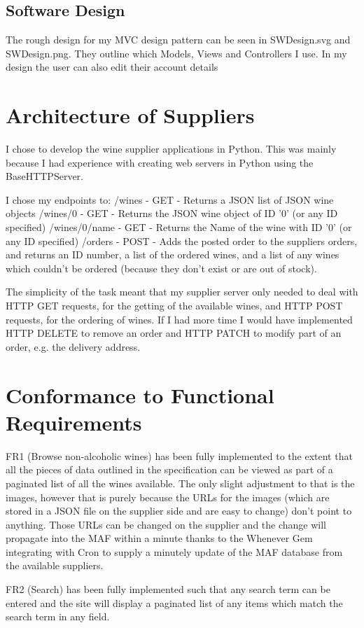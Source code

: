 \documentclass[11pt]{article}
\begin{document}
\subsection{Software Design}
The rough design for my MVC design pattern can be seen in SWDesign.svg and SWDesign.png. They outline which Models, Views and Controllers I use.
In my design the user can also edit their account details
\section{Architecture of Suppliers}
I chose to develop the wine supplier applications in Python. This was mainly because I had experience with creating web servers in Python using the BaseHTTPServer. 

I chose my endpoints to:
/wines - GET - Returns a JSON list of JSON wine objects
/wines/0 - GET - Returns the JSON wine object of ID '0' (or any ID specified)
/wines/0/name - GET - Returns the Name of the wine with ID '0' (or any ID specified)
/orders - POST - Adds the posted order to the suppliers orders, and returns an ID number, a list of the ordered wines, and a list of any wines which couldn't be ordered (because they don't exist or are out of stock).

The simplicity of the task meant that my supplier server only needed to deal with HTTP GET requests, for the getting of the available wines, and HTTP POST requests, for the ordering of wines. If I had more time I would have implemented HTTP DELETE to remove an order and HTTP PATCH to modify part of an order, e.g. the delivery address.

\section{Conformance to Functional Requirements}
FR1 (Browse non-alcoholic wines) has been fully implemented to the extent that all the pieces of data outlined in the specification can be viewed as part of a paginated list of all the wines available. The only slight adjustment to that is the images, however that is purely because the URLs for the images (which are stored in a JSON file on the supplier side and are easy to change) don't point to anything. Those URLs can be changed on the supplier and the change will propagate into the MAF within a minute thanks to the Whenever Gem integrating with Cron to supply a minutely update of the MAF database from the available suppliers.

FR2 (Search) has been fully implemented such that any search term can be entered and the site will display a paginated list of any items which match the search term in any field.
\end{document}
